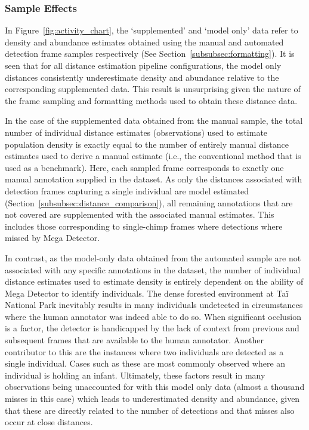 \subsubsection{Sample Effects}

In Figure~\ref{fig:activity_chart}, the `supplemented' and `model only' data refer to density
and abundance estimates obtained using the manual and automated detection frame samples respectively
(See Section~\ref{subsubsec:formatting}).
It is seen that for all distance estimation pipeline configurations, the model only distances
consistently underestimate density and abundance relative to the corresponding supplemented
data.
This result is unsurprising given the nature of the frame sampling and formatting methods used
to obtain these distance data.

In the case of the supplemented data obtained from the manual sample, the total number of individual
distance estimates (observations) used to estimate population density is exactly equal to the
number of entirely manual distance estimates used to derive a manual estimate (i.e., the conventional
method that is used as a benchmark).
Here, each sampled frame corresponds to exactly one manual annotation supplied in the dataset.
As only the distances associated with detection frames capturing a single individual are model estimated
(Section~\ref{subsubsec:distance_comparison}), all remaining annotations that are not covered are
supplemented with the associated manual estimates.
This includes those corresponding to single-chimp frames where detections where missed by Mega Detector.

In contrast, as the model-only data obtained from the automated sample are not associated with any
specific annotations in the dataset, the number of individual distance estimates used to estimate
density is entirely dependent on the ability of Mega Detector to identify individuals.
The dense forested environment at Taï National Park inevitably results in many individuals undetected
in circumstances where the human annotator was indeed able to do so.
When significant occlusion is a factor, the detector is handicapped by the lack of context from
previous and subsequent frames that are available to the human annotator.
Another contributor to this are the instances where two individuals are detected as a single individual.
Cases such as these are most commonly observed where an individual is holding an infant.
Ultimately, these factors result in many observations being unaccounted for with this model only data
(almost a thousand misses in this case) which leads to underestimated density and abundance, given that these
are directly related to the number of detections and that misses also occur at close distances.

